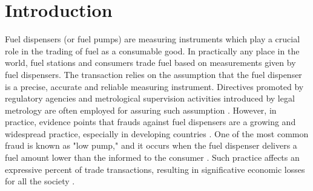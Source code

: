 \documentclass[sigplan]{acmart}
\begin{document}
%
%




\maketitle

\section{Introduction}
Fuel dispensers (or fuel pumps) are measuring instruments which play a crucial role in the trading of fuel as a consumable good.
In practically any place in the world, fuel stations and consumers trade fuel based on measurements given by fuel dispensers.
The transaction relies on the assumption that the fuel dispenser is a precise, accurate and reliable measuring instrument.
Directives promoted by regulatory agencies and metrological supervision activities introduced by legal metrology are often employed for assuring such assumption \cite{RodriguesFilho2015}.
However, in practice, evidence points that frauds against fuel dispensers are a growing and widespread practice, especially in developing countries \cite{Luchsinger2008,Leitao2014a,Beteto2016,RodriguesFilho2016}.
One of the most common fraud is known as "low pump," and it occurs when the fuel dispenser delivers a fuel amount lower than the informed to the consumer \cite{Beteto2016}.
Such practice affects an expressive percent of trade transactions, resulting in significative economic losses for all the society \cite{RodriguesFilho2016}.
\end{document}
